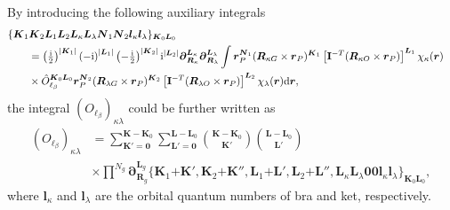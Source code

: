 \documentclass[a4paper,11pt,twoside,openright]{book}
\begin{document}
By introducing the following auxiliary integrals~\cite{bgkr}
\begin{align}
  \label{eq:auxiliary-int}
    \{\boldsymbol{K}_{1}\boldsymbol{K}_{2}\boldsymbol{L}_{1}\boldsymbol{L}_{2}%
      \boldsymbol{L}_{\kappa}\boldsymbol{L}_{\lambda}%
      \boldsymbol{N}_{1}\boldsymbol{N}_{2}\boldsymbol{l}_{\kappa}%
      \boldsymbol{l}_{\lambda}\}_{\boldsymbol{K}_{0}\boldsymbol{L}_{0}}\hspace{-14em}\\
  &=\left(\tfrac{\text{i}}{2}\right)^{|\boldsymbol{K}_{1}|}%
    \left(-\text{i}\right)^{|\boldsymbol{L}_{1}|}%
    \left(-\tfrac{\text{i}}{2}\right)^{|\boldsymbol{K}_{2}|}%
    \text{i}^{|\boldsymbol{L}_{2}|}%
    \boldsymbol{\partial}_{\boldsymbol{R}_{\kappa}}^{\boldsymbol{L}_{\kappa}}%
    \boldsymbol{\partial}_{\boldsymbol{R}_{\lambda}}^{\boldsymbol{L}_{\lambda}}%
    \int\boldsymbol{r}_{P}^{\boldsymbol{N}_{1}}%
    (\boldsymbol{R}_{\kappa G}\times\boldsymbol{r}_{P})^{\boldsymbol{K}_{1}}%
    \left[\mathbf{I}^{-T}(\boldsymbol{R}_{\kappa O}\times\boldsymbol{r}_{P})\right]^{\boldsymbol{L}_{1}}%
    \chi_{\kappa}(\boldsymbol{r})\nonumber\\
  &\times\hat{O}_{\ell_{\beta}}^{\boldsymbol{K}_{0}\boldsymbol{L}_{0}}%
    \boldsymbol{r}_{P}^{\boldsymbol{N}_{2}}%
    (\boldsymbol{R}_{\lambda G}\times\boldsymbol{r}_{P})^{\boldsymbol{K}_{2}}%
    \left[\mathbf{I}^{-T}(\boldsymbol{R}_{\lambda O}\times\boldsymbol{r}_{P})\right]^{\boldsymbol{L}_{2}}%
    \chi_{\lambda}(\boldsymbol{r})\mathrm{d}\boldsymbol{r},\nonumber
\end{align}
the integral $(O_{\ell_{\beta}})_{\kappa\lambda}$ could be further written as
\begin{align}
  (O_{\ell_{\beta}})_{\kappa\lambda}
  \label{eq:lao-sum-aux-int}
  &=\sum_{\boldsymbol{K}'=\boldsymbol{0}}^{\boldsymbol{K}-\boldsymbol{K}_{0}}%
    \sum_{\boldsymbol{L}'=\boldsymbol{0}}^{\boldsymbol{L}-\boldsymbol{L}_{0}}
    \binom{\boldsymbol{K}-\boldsymbol{K}_{0}}{\boldsymbol{K}'}%
    \binom{\boldsymbol{L}-\boldsymbol{L}_{0}}{\boldsymbol{L}'}\\
  &\times\prod^{N_{g}}\boldsymbol{\partial}_{\boldsymbol{R}_{g}}^{\boldsymbol{L}_{g}}%
    \{\boldsymbol{K}_{1}\mathrm{+}\boldsymbol{K}',\boldsymbol{K}_{2}\mathrm{+}\boldsymbol{K}'',%
      \boldsymbol{L}_{1}\mathrm{+}\boldsymbol{L}',\boldsymbol{L}_{2}\mathrm{+}\boldsymbol{L}'',%
      \boldsymbol{L}_{\kappa}\boldsymbol{L}_{\lambda}\boldsymbol{00}%
      \boldsymbol{l}_{\kappa}\boldsymbol{l}_{\lambda}\}_{\boldsymbol{K}_{0}\boldsymbol{L}_{0}},\nonumber
\end{align}
where $\boldsymbol{l}_{\kappa}$ and $\boldsymbol{l}_{\lambda}$ are the orbital quantum numbers
of bra and ket, respectively.
\end{document}
